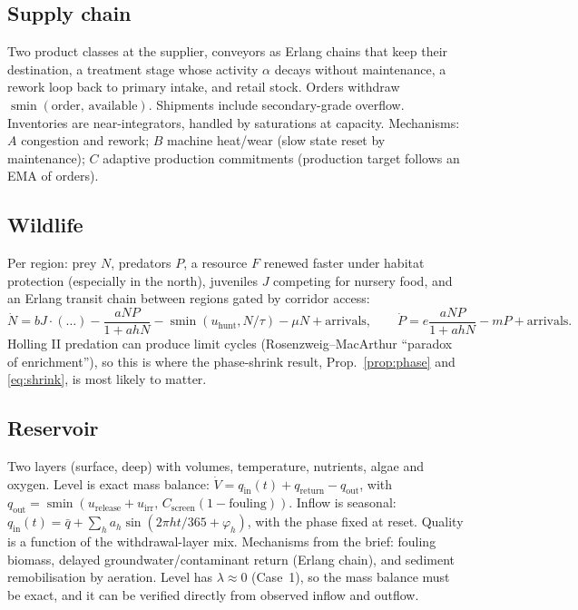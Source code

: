 \documentclass[11pt]{article}
\theoremstyle{plain}
\theoremstyle{definition}
\theoremstyle{remark}
\newcommand{\softmin}{\operatorname{smin}}
\begin{document}
\subsection{Supply chain}
Two product classes at the supplier, conveyors as Erlang chains that keep their destination, a treatment stage whose activity $\alpha$ decays without maintenance, a rework loop back to primary intake, and retail stock. Orders withdraw $\softmin(\text{order},\,\text{available})$. Shipments include secondary-grade overflow. Inventories are near-integrators, handled by saturations at capacity. Mechanisms: $A$ congestion and rework; $B$ machine heat/wear (slow state reset by maintenance); $C$ adaptive production commitments (production target follows an EMA of orders).

\subsection{Wildlife}
Per region: prey $N$, predators $P$, a resource $F$ renewed faster under habitat protection (especially in the north), juveniles $J$ competing for nursery food, and an Erlang transit chain between regions gated by corridor access:
\[
\dot N=bJ\!\cdot\!(\ldots)-\frac{aNP}{1+ahN}-\softmin(u_{\text{hunt}},N/\tau)-\mu N+\text{arrivals},\qquad \dot P=e\frac{aNP}{1+ahN}-mP+\text{arrivals}.
\]
Holling II predation can produce limit cycles (Rosenzweig--MacArthur ``paradox of enrichment''), so this is where the phase-shrink result, Prop.~\ref{prop:phase} and \eqref{eq:shrink}, is most likely to matter.

\subsection{Reservoir}
Two layers (surface, deep) with volumes, temperature, nutrients, algae and oxygen. Level is exact mass balance: $\dot V=q_{\text{in}}(t)+q_{\text{return}}-q_{\text{out}}$, with $q_{\text{out}}=\softmin(u_{\text{release}}+u_{\text{irr}},\,C_{\text{screen}}(1-\text{fouling}))$. Inflow is seasonal: $q_{\text{in}}(t)=\bar q+\sum_h a_h\sin(2\pi ht/365+\varphi_h)$, with the phase fixed at reset. Quality is a function of the withdrawal-layer mix. Mechanisms from the brief: fouling biomass, delayed groundwater/contaminant return (Erlang chain), and sediment remobilisation by aeration. Level has $\lambda\approx0$ (Case~1), so the mass balance must be exact, and it can be verified directly from observed inflow and outflow.
\end{document}
